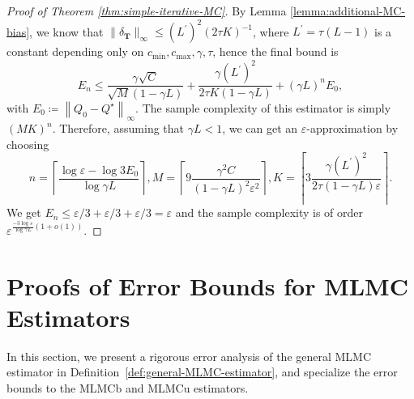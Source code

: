 \documentclass[11pt]{article}
\numberwithin{equation}{section}
\theoremstyle{definition}
\theoremstyle{remark}
\begin{document}
\begin{proof}[Proof of Theorem \ref{thm:simple-iterative-MC}]
By Lemma \ref{lemma:additional-MC-bias}, we know that $\|\delta_{\mathbf T} \|_{\infty} \leq (L^\prime)^2 (2 \tau K)^{-1}$, where 
$L^\prime =  \tau (L - 1) $ is a constant depending only on $c_{\min}, c_{\max}, \gamma,\tau$, hence the final bound is
\begin{equation*}
	E_{n} \leq \frac{\gamma \sqrt{C}}{\sqrt{M}(1 - \gamma L)} + \frac{\gamma (L^\prime)^2}{2 \tau K(1 - \gamma L)} + (\gamma L)^n E_0,
	\end{equation*}
    with   $E_0\coloneqq \left\|Q_0 - Q^\star\right\|_{\infty}$. 
The sample complexity of this estimator is simply $(MK)^n$. Therefore, assuming that $\gamma L < 1$, we can get an $\varepsilon$-approximation by choosing 
\[
	n = \left\lceil \frac{\log \varepsilon - \log 3E_0}{\log \gamma L}\right\rceil, M = \left\lceil 9\frac{\gamma^2C}{(1-\gamma L)^2\varepsilon^2}\right\rceil, K = \left\lceil 3 \frac{\gamma (L^\prime)^2}{2 \tau (1-\gamma L)\varepsilon}\right\rceil.
\]
We get $E_n \leq \varepsilon/ 3 + \varepsilon/3 + \varepsilon/3 = \varepsilon$ and the sample complexity is of order $\varepsilon^{ \frac{-3 \log \varepsilon}{\log \gamma L}(1 + o(1))}$.
\end{proof}
\section{Proofs of  Error Bounds for MLMC Estimators}
\label{section:analysis-of-the-error}
In this section, we present a rigorous error analysis of the  general MLMC estimator   in Definition~\ref{def:general-MLMC-estimator}, and specialize the error bounds to the MLMCb and MLMCu estimators.
\end{document}
